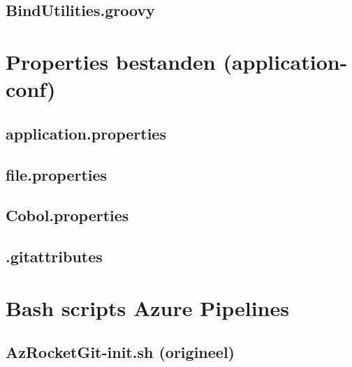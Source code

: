 \documentclass[dutch,dit,thesis]{hogentreport}
\begin{document}
\pagebreak
\section{BindUtilities.groovy}
\label{sec:bindutilgroovy}



\chapter{Properties bestanden (application-conf)}
\label{ch:appropappli}
\section{application.properties}
\label{sec:appliprops}


\pagebreak
\section{file.properties}
\label{sec:fileprops}


\pagebreak
\section{Cobol.properties}
\label{sec:cobpropsappli}


\pagebreak
\section{.gitattributes}
\label{sec:gitattr}


\chapter{Bash scripts Azure Pipelines}
\label{ch:apbashpipe}
\section{AzRocketGit-init.sh (origineel)}
\label{sec:gitinitorig}

    
\end{document}
